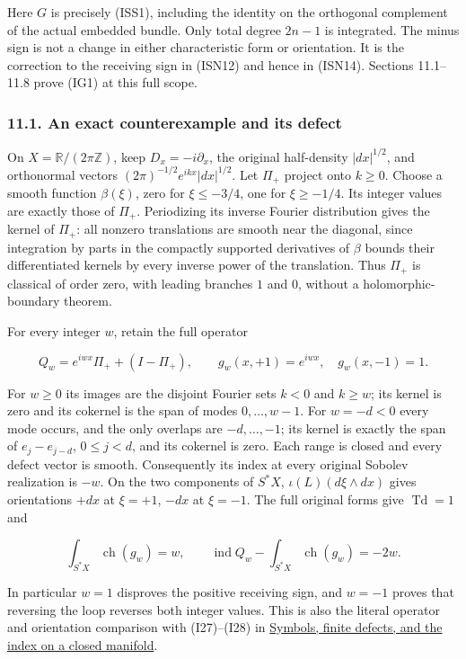 \documentclass[
  11pt,
]{article}
\begin{document}
Here \(G\) is precisely (ISS1), including the identity on the orthogonal
complement of the actual embedded bundle. Only total degree \(2n-1\) is
integrated. The minus sign is not a change in either characteristic form
or orientation. It is the correction to the receiving sign in (ISN12)
and hence in (ISN14). Sections 11.1--11.8 prove (IG1) at this full
scope.

\subsubsection{11.1. An exact counterexample and its
defect}\label{an-exact-counterexample-and-its-defect}

On \(X=\mathbb R/(2\pi\mathbb Z)\), keep \(D_x=-i\partial_x\), the
original half-density \(|dx|^{1/2}\), and orthonormal vectors
\((2\pi)^{-1/2}e^{ikx}|dx|^{1/2}\). Let \(\Pi_+\) project onto
\(k\geq0\). Choose a smooth function \(\beta(\xi)\), zero for
\(\xi\leq-3/4\), one for \(\xi\geq-1/4\). Its integer values are exactly
those of \(\Pi_+\). Periodizing its inverse Fourier distribution gives
the kernel of \(\Pi_+\): all nonzero translations are smooth near the
diagonal, since integration by parts in the compactly supported
derivatives of \(\beta\) bounds their differentiated kernels by every
inverse power of the translation. Thus \(\Pi_+\) is classical of order
zero, with leading branches \(1\) and \(0\), without a
holomorphic-boundary theorem.

For every integer \(w\), retain the full operator

\[
 Q_w=e^{iwx}\Pi_++(I-\Pi_+),\qquad
 g_w(x,+1)=e^{iwx},\quad g_w(x,-1)=1.
\tag{IG2}
\]

For \(w\geq0\) its images are the disjoint Fourier sets \(k<0\) and
\(k\geq w\); its kernel is zero and its cokernel is the span of modes
\(0,\ldots,w-1\). For \(w=-d<0\) every mode occurs, and the only
overlaps are \(-d,\ldots,-1\); its kernel is exactly the span of
\(e_j-e_{j-d}\), \(0\leq j<d\), and its cokernel is zero. Each range is
closed and every defect vector is smooth. Consequently its index at
every original Sobolev realization is \(-w\). On the two components of
\(S^*X\), \(\iota(L)(d\xi\wedge dx)\) gives orientations \(+dx\) at
\(\xi=+1\), \(-dx\) at \(\xi=-1\). The full original forms give
\(\operatorname{Td}=1\) and

\[
 \int_{S^*X}\operatorname{ch}(g_w)=w,
 \qquad
 \operatorname{ind}Q_w-\int_{S^*X}\operatorname{ch}(g_w)=-2w.
\tag{IG3}
\]

In particular \(w=1\) disproves the positive receiving sign, and
\(w=-1\) proves that reversing the loop reverses both integer values.
This is also the literal operator and orientation comparison with
(I27)--(I28) in \href{global-elliptic-symbol-index.pdf}{Symbols, finite
defects, and the index on a closed manifold}.
\end{document}
